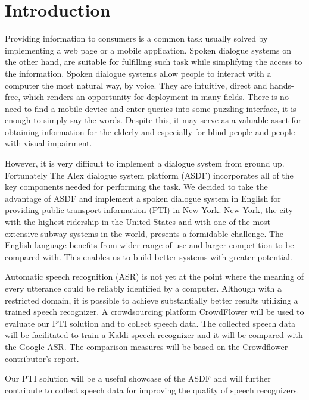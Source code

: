 

\chapter*{Introduction}

Providing information to consumers is a common task usually solved by implementing a web page or a mobile application.
Spoken dialogue systems on the other hand, are suitable for fulfilling such task while simplifying the access to the information.
Spoken dialogue systems allow people to interact with a computer the most natural way, by voice.
They are intuitive, direct and hands-free, which renders an opportunity for deployment in many fields.
There is no need to find a mobile device and enter queries into some puzzling interface, it is enough to simply say the words.
Despite this, it may serve as a valuable asset for obtaining information for the elderly and especially for blind people and people with visual impairment.%

However, it is very difficult to implement a dialogue system from ground up.
Fortunately The Alex dialogue system platform\cite{asdf} (ASDF) incorporates all of the key components needed for performing the task.
We decided to take the advantage of ASDF and implement a spoken dialogue system in English for providing public transport information (PTI) in New York.
New York, the city with the highest ridership in the United States and with one of the most extensive subway systems in the world, presents a formidable challenge.
The English language benefits from wider range of use and larger competition to be compared with.
This enables us to build better systems with greater potential.

Automatic speech recognition (ASR) is not yet at the point where the meaning of every utterance could be reliably identified by a computer.\cite{asr}
Although with a restricted domain, it is possible to achieve substantially better results utilizing a trained speech recognizer.
A crowdsourcing platform CrowdFlower will be used to evaluate our PTI solution and to collect speech data.
The collected speech data will be facilitated to train a Kaldi speech recognizer and it will be compared with the Google ASR.
The comparison measures will be based on the Crowdflower contributor's report. %

Our PTI solution will be a useful showcase of the ASDF and will further contribute to collect speech data for improving the quality of speech recognizers.  %

